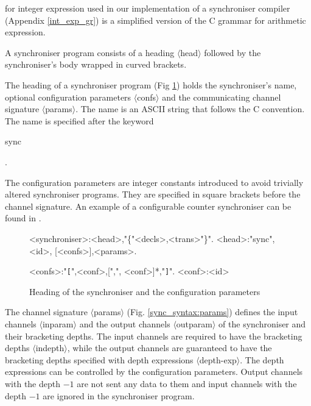 for integer expression used in our implementation of a synchroniser compiler (Appendix \ref{int_exp_gr}) is a simplified version of the C grammar for arithmetic expression.


A synchroniser program consists of a heading $\langle$head$\rangle$ followed by the synchroniser's body wrapped in curved brackets.

The heading of a synchroniser program (Fig \ref{sync_syntax:head}) holds the synchroniser's name, optional configuration parameters $\langle$confs$\rangle$ and the communicating channel signature $\langle$params$\rangle$. The name is an ASCII string that follows the C convention. The name is specified after the keyword \begin{bf}sync\end{bf}.

The configuration parameters are integer constants introduced to avoid trivially altered synchroniser programs. They are specified in square brackets before the channel signature. An example of a configurable counter synchroniser can be found in \cite{astrakahn}.

\begin{figure}[h!]
\small
\begin{grammar}
<synchroniser>:<head>,"\{"<decls>,<trans>"\}".
<head>:"sync", <id>, [<confs>],<params>.

<confs>:"{\tt [}",<conf>,[",", <conf>]*,"{\tt ]}".
<conf>:<id>
\end{grammar}
\caption{Heading of the synchroniser and the configuration parameters}
\label{sync_syntax:head}
\end{figure}

The channel signature $\langle$params$\rangle$ (Fig. \ref{sync_syntax:params}) defines the input channels $\langle$inparam$\rangle$ and the output channels $\langle$outparam$\rangle$ of the synchroniser and their bracketing depths. The input channels are required to have the bracketing depths $\langle$indepth$\rangle$, while the output channels are guaranteed to have the bracketing depths specified with depth expressions $\langle$depth-exp$\rangle$. The depth expressions can be controlled by the configuration parameters. Output channels with the depth $-1$ are not sent any data to them and input channels with the depth $-1$ are ignored in the synchroniser program.

